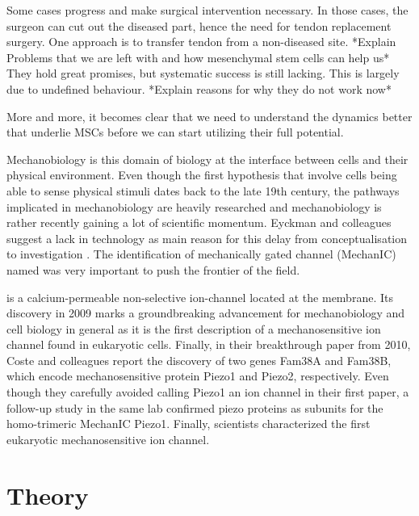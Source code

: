 Some cases progress and make surgical intervention necessary. In those cases, the surgeon can cut out the diseased part, hence the need for tendon replacement surgery.  One approach is to transfer tendon from a non-diseased site. *Explain Problems that we are left with and how mesenchymal stem cells can help us* They hold great promises, but systematic success is still lacking. This is largely due to undefined behaviour. *Explain reasons for why they do not work now* 

More and more, it becomes clear that we need to understand the dynamics better that underlie MSCs before we can start utilizing their full potential.\par 

Mechanobiology is this domain of biology at the interface between cells and their physical environment. 
Even though the first hypothesis that involve cells being able to sense physical stimuli dates back to the late 19th century, the pathways implicated in mechanobiology are heavily researched and mechanobiology is rather recently gaining a lot of scientific momentum. Eyckman and colleagues suggest a lack in technology as main reason for this delay from conceptualisation to investigation \cite{Eyckmans2011}. 
The identification of mechanically gated channel (MechanIC) named \Piezo{} was very important to push the frontier of the field. \par
\Piezo{} is a calcium-permeable non-selective ion-channel located at the membrane. Its discovery in 2009 marks a groundbreaking advancement for mechanobiology and cell biology in general as it is the first description of a mechanosensitive ion channel found in eukaryotic cells.\cite{Coste2010} 
Finally, in their breakthrough paper from 2010, Coste and colleagues report the discovery of two genes Fam38A and Fam38B, which encode mechanosensitive protein Piezo1 and Piezo2, respectively. Even though they carefully avoided calling Piezo1 an ion channel in their first paper, a follow-up study in the same lab confirmed piezo proteins as subunits for the homo-trimeric MechanIC Piezo1. Finally, scientists characterized the first eukaryotic mechanosensitive ion channel. 




\section{Theory}

\subsection{\Piezo{}}

